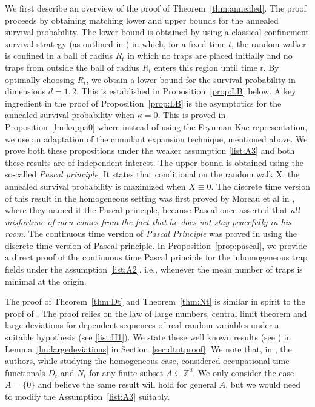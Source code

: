 \documentclass{article}[12pt]
\theoremstyle{definition}
\newcommand{\Z}{\mathbb{Z}}
\newcommand{\1}{\mathbbm{1}}
\begin{document}
 We first describe an overview of the proof of Theorem~\ref{thm:annealed}.  The proof proceeds by obtaining matching lower and upper bounds for the annealed survival probability. The lower bound is obtained by using a classical confinement survival strategy (as outlined in \cite{DGRS2012}) in which, for a fixed time $t$, the random walker is confined in a ball of radius $R_t$ in which no traps are placed initially and no traps from outside the ball of radius $R_t$ enters this region until time $t$. By optimally choosing $R_t$, we obtain a lower bound for the survival probability in dimensions $d=1,2$. This is established in Proposition~\ref{prop:LB} below. A key ingredient in the proof of Proposition~\ref{prop:LB} is the asymptotics for the annealed survival probability when $\kappa =0$. This is proved in Proposition~\ref{lm:kappa0} where instead of using the Feynman-Kac representation, we use an adaptation of the cumulant expansion technique, mentioned above. We prove both these propositions under the weaker assumption \ref{list:A3} and both these results are of independent interest. The upper bound is obtained using the so-called \textit{Pascal principle}. It states that conditional on the random walk X, the annealed survival probability is maximized when $X \equiv 0$. The discrete time version of this result in the homogeneous setting was first proved by Moreau et al in \cite{MOBC2003, MOBC2004}, where they named it the Pascal principle, because Pascal once asserted that \emph{all misfortune of men comes from the fact that he does not stay peacefully in his room}. The continuous time version of {\textit{Pascal Principle}} was proved in \cite[Proposition 2.1]{DGRS2012} using the discrete-time version of Pascal principle. In Proposition~\ref{prop:pascal}, we provide a direct proof of the continuous time Pascal principle for the inhomogeneous trap fields under the assumption \ref{list:A2}, i.e., whenever the mean number of traps is minimal at the origin. 

The proof of Theorem~\ref{thm:Dt} and Theorem~\ref{thm:Nt} is similar in spirit to the proof of \cite[Theorem~1, Theorem~2]{CG1984}. The proof relies on the law of large numbers, central limit theorem and large deviations for dependent sequences of real random variables under a suitable hypothesis (see \ref{list:H1}). We state these well known results (see \cite{S1969,PS1975, S1978}) in Lemma~\ref{lm:largedeviations} in Section~\ref{sec:dtntproof}. We note that, in \cite{CG1984}, the authors, while studying the homogeneous case, considered occupational time functionals $D_t$ and $N_t$ for any finite subset $A\subseteq \Z^d$. We only consider the case $A = \{0\}$ and believe the same result will hold for general $A$, but we would need to modify the Assumption~\ref{list:A3} suitably.
\end{document}
